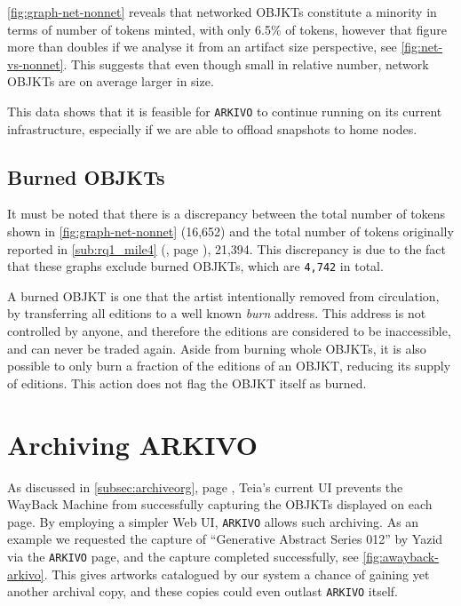 \autoref{fig:graph-net-nonnet} reveals that networked OBJKTs constitute a minority in terms of number of tokens minted, with only 6.5\% of tokens, however that figure more than doubles if we analyse it from an artifact size perspective, see \autoref{fig:net-vs-nonnet}. This suggests that even though small in relative number, network OBJKTs are on average larger in size. 


This data shows that it is feasible for \texttt{ARKIVO} to continue running on its current infrastructure, especially if we are able to offload snapshots to home nodes.

\subsection{Burned OBJKTs}

It must be noted that there is a discrepancy between the total number of tokens shown in \autoref{fig:graph-net-nonnet} (16,652) and the total number of tokens originally reported in \autoref{sub:rq1_mile4} (, page \pageref{sub:rq1_mile4}), 21,394. This discrepancy is due to the fact that these graphs exclude burned OBJKTs, which are \texttt{4,742} in total.

A burned OBJKT is one that the artist intentionally removed from circulation, by transferring all editions to a well known \emph{burn} address. This address is not controlled by anyone, and therefore the editions are considered to be inaccessible, and can never be traded again. Aside from burning whole OBJKTs, it is also possible to only burn a fraction of the editions of an OBJKT, reducing its supply of editions. This action does not flag the OBJKT itself as burned.


\section{Archiving ARKIVO}

As discussed in \autoref{subsec:archiveorg}, page \pageref{subsec:archiveorg}, Teia's current UI prevents the WayBack Machine from successfully capturing the OBJKTs displayed on each page. By employing a simpler Web UI, \texttt{ARKIVO} allows such archiving. As an example we requested the capture of ``Generative Abstract Series 012'' by Yazid via the \texttt{ARKIVO} page, and the capture completed successfully, see \autoref{fig:awayback-arkivo}. This gives artworks catalogued by our system a chance of gaining yet another archival copy, and these copies could even outlast \texttt{ARKIVO} itself.


